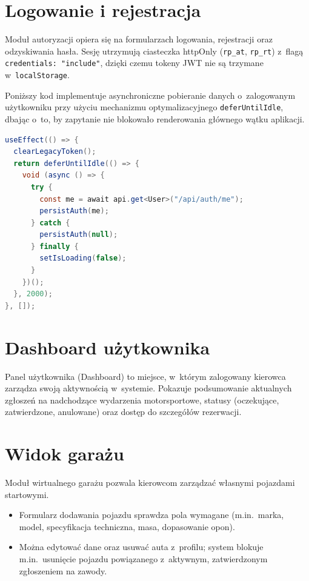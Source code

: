 \documentclass{sprz}
\begin{document}
\section{Logowanie i rejestracja}
Moduł autoryzacji opiera się na formularzach logowania, rejestracji oraz odzyskiwania hasła. Sesję utrzymują ciasteczka httpOnly (\texttt{rp\_at}, \texttt{rp\_rt}) z~flagą \texttt{credentials: "include"}, dzięki czemu tokeny JWT nie są trzymane w~\texttt{localStorage}.

Poniższy kod implementuje asynchroniczne pobieranie danych o~zalogowanym użytkowniku przy użyciu mechanizmu optymalizacyjnego \texttt{deferUntilIdle}, dbając o~to, by zapytanie nie blokowało renderowania głównego wątku aplikacji.

\begin{lstlisting}[language=Java,caption={Wczytywanie sesji w~\texttt{AuthContext} (httpOnly cookies).},label={lst:ch11-auth}]
useEffect(() => {
  clearLegacyToken();
  return deferUntilIdle(() => {
    void (async () => {
      try {
        const me = await api.get<User>("/api/auth/me");
        persistAuth(me);
      } catch {
        persistAuth(null);
      } finally {
        setIsLoading(false);
      }
    })();
  }, 2000);
}, []);
\end{lstlisting}

\section{Dashboard użytkownika}
Panel użytkownika (Dashboard) to miejsce, w~którym zalogowany kierowca zarządza swoją aktywnością w~systemie. Pokazuje podsumowanie aktualnych zgłoszeń na nadchodzące wydarzenia motorsportowe, statusy (oczekujące, zatwierdzone, anulowane) oraz dostęp do szczegółów rezerwacji.

\section{Widok garażu}
Moduł wirtualnego garażu pozwala kierowcom zarządzać własnymi pojazdami startowymi.
\begin{itemize}
  \item Formularz dodawania pojazdu sprawdza pola wymagane (m.in.\ marka, model, specyfikacja techniczna, masa, dopasowanie opon).
  \item Można edytować dane oraz usuwać auta z~profilu; system blokuje m.in.\ usunięcie pojazdu powiązanego z~aktywnym, zatwierdzonym zgłoszeniem na zawody.
\end{itemize}
\end{document}
